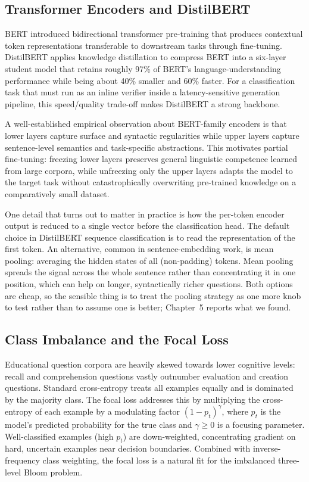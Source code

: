 \documentclass[12pt,a4paper]{report}
\begin{document}
\subsection{Transformer Encoders and DistilBERT}
BERT \parencite{devlin2019bert} introduced bidirectional transformer
pre-training that produces contextual token representations transferable to
downstream tasks through fine-tuning. DistilBERT \parencite{sanh2019distilbert}
applies knowledge distillation to compress BERT into a six-layer student model
that retains roughly 97\% of BERT's language-understanding performance while
being about 40\% smaller and 60\% faster. For a classification task that must run
as an inline verifier inside a latency-sensitive generation pipeline, this
speed/quality trade-off makes DistilBERT a strong backbone.

A well-established empirical observation about BERT-family encoders is that lower
layers capture surface and syntactic regularities while upper layers capture
sentence-level semantics and task-specific abstractions. This motivates partial
fine-tuning: freezing lower layers preserves general linguistic competence
learned from large corpora, while unfreezing only the upper layers adapts the
model to the target task without catastrophically overwriting pre-trained
knowledge on a comparatively small dataset.

One detail that turns out to matter in practice is how the per-token encoder
output is reduced to a single vector before the classification head. The default
choice in DistilBERT sequence classification is to read the representation of the
first token. An alternative, common in sentence-embedding work, is mean pooling:
averaging the hidden states of all (non-padding) tokens. Mean pooling spreads the
signal across the whole sentence rather than concentrating it in one position,
which can help on longer, syntactically richer questions. Both options are
cheap, so the sensible thing is to treat the pooling strategy as one more knob to
test rather than to assume one is better; Chapter~5 reports what we found.

\subsection{Class Imbalance and the Focal Loss}
Educational question corpora are heavily skewed towards lower cognitive levels:
recall and comprehension questions vastly outnumber evaluation and creation
questions. Standard cross-entropy treats all examples equally and is dominated by
the majority class. The focal loss \parencite{lin2017focal} addresses this by
multiplying the cross-entropy of each example by a modulating factor
$(1-p_t)^{\gamma}$, where $p_t$ is the model's predicted probability for the true
class and $\gamma \ge 0$ is a focusing parameter. Well-classified examples
(high $p_t$) are down-weighted, concentrating gradient on hard, uncertain
examples near decision boundaries. Combined with inverse-frequency class
weighting, the focal loss is a natural fit for the imbalanced three-level Bloom
problem.
\end{document}
